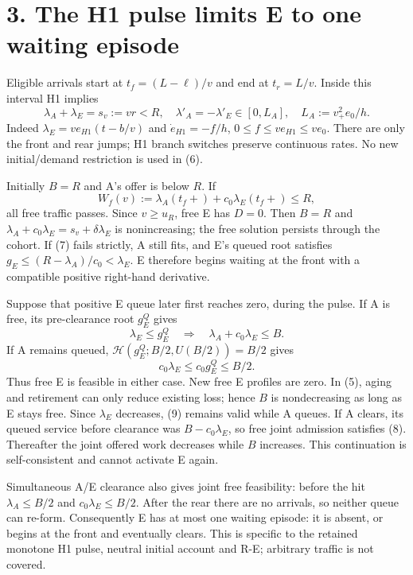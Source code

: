 \documentclass[11pt,a4paper]{article}
\begin{document}
\newpage
\section*{3. The H1 pulse limits E to one waiting episode}
Eligible arrivals start at $t_f=(L-\ell)/v$ and end at $t_r=L/v$.
Inside this interval H1 implies
\begin{equation}
 \lambda_A+\lambda_E=s_v:=vr<R,\quad
 \lambda'_A=-\lambda'_E\in[0,L_A],\quad
 L_A:=v_+^2e_0/h.\tag{6}
\end{equation}
Indeed $\lambda_E=v e_{H1}(t-b/v)$ and
$\dot e_{H1}=-f/h$, $0\leq f\leq v e_{H1}\leq ve_0$.
There are only the front and rear jumps; H1 branch switches preserve
continuous rates. No new initial/demand restriction is used in (6).

Initially $B=R$ and A's offer is below $R$. If
\begin{equation}
 W_f(v):=\lambda_A(t_f+)+c_0\lambda_E(t_f+)\leq R,\tag{7}
\end{equation}
all free traffic passes. Since $v\geq u_R$, free E has $D=0$.
Then $B=R$ and $\lambda_A+c_0\lambda_E=s_v+\delta\lambda_E$
is nonincreasing; the free solution persists through the cohort. If (7)
fails strictly, A still fits, and E's queued root satisfies
$g_E\leq(R-\lambda_A)/c_0<\lambda_E$. E therefore begins waiting
at the front with a compatible positive right-hand derivative.

Suppose that positive E queue later first reaches zero, during the pulse.
If A is free, its pre-clearance root $g_E^Q$ gives
\begin{equation}
 \lambda_E\leq g_E^Q\quad\Longrightarrow\quad
 \lambda_A+c_0\lambda_E\leq B.\tag{8}
\end{equation}
If A remains queued, $\mathcal H(g_E^Q;B/2,U(B/2))=B/2$ gives
\begin{equation}
 c_0\lambda_E\leq c_0g_E^Q\leq B/2.\tag{9}
\end{equation}
Thus free E is feasible in either case. New free E profiles are zero.
In (5), aging and retirement can only reduce existing loss; hence $B$
is nondecreasing as long as E stays free. Since $\lambda_E$ decreases,
(9) remains valid while A queues. If A clears, its queued service before
clearance was $B-c_0\lambda_E$, so free joint admission satisfies (8).
Thereafter the joint offered work decreases while $B$ increases. This
continuation is self-consistent and cannot activate E again.

Simultaneous A/E clearance also gives joint free feasibility: before the
hit $\lambda_A\leq B/2$ and $c_0\lambda_E\leq B/2$. After the rear
there are no arrivals, so neither queue can re-form. Consequently E has
at most one waiting episode: it is absent, or begins at the front and
eventually clears. This is specific to the retained monotone H1 pulse,
neutral initial account and R-E; arbitrary traffic is not covered.
\end{document}
